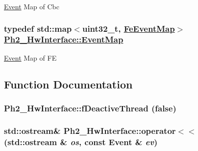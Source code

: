 \hyperlink{class_ph2___hw_interface_1_1_event}{Event} Map of Cbc \hypertarget{namespace_ph2___hw_interface_cf9f41d647e7a3ad9bae233b04b9e3bc}{
\subsubsection[EventMap]{\setlength{\rightskip}{0pt plus 5cm}typedef std::map$<$uint32\_\-t, \hyperlink{namespace_ph2___hw_interface_50d97ee46941c2c0c2ecadc929e41b05}{Fe\-Event\-Map}$>$ \hyperlink{namespace_ph2___hw_interface_cf9f41d647e7a3ad9bae233b04b9e3bc}{Ph2\_\-Hw\-Interface::Event\-Map}}}
\label{namespace_ph2___hw_interface_cf9f41d647e7a3ad9bae233b04b9e3bc}


\hyperlink{class_ph2___hw_interface_1_1_event}{Event} Map of FE 

\subsection{Function Documentation}
\hypertarget{namespace_ph2___hw_interface_45c84dee08a5b37d565bbcd5eeab2b4d}{
\subsubsection[fDeactiveThread]{\setlength{\rightskip}{0pt plus 5cm}Ph2\_\-Hw\-Interface::f\-Deactive\-Thread (false)}}
\label{namespace_ph2___hw_interface_45c84dee08a5b37d565bbcd5eeab2b4d}


\hypertarget{namespace_ph2___hw_interface_1ac2256abcd1c8a18fe02161b3735c80}{
\subsubsection[operator$<$$<$]{\setlength{\rightskip}{0pt plus 5cm}std::ostream\& Ph2\_\-Hw\-Interface::operator$<$$<$ (std::ostream \& {\em os}, const Event \& {\em ev})}}
\label{namespace_ph2___hw_interface_1ac2256abcd1c8a18fe02161b3735c80}


